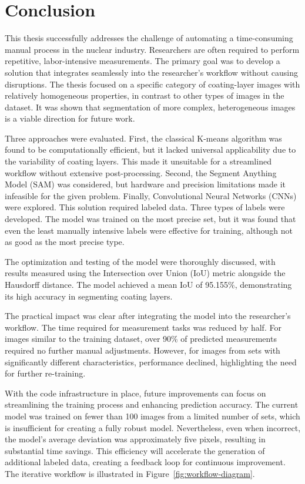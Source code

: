 \chapter{Conclusion} \label{chap:con}

This thesis successfully addresses the challenge of automating a time-consuming manual process in the nuclear industry. Researchers are often required to perform repetitive, labor-intensive measurements. The primary goal was to develop a solution that integrates seamlessly into the researcher’s workflow without causing disruptions. The thesis focused on a specific category of coating-layer images with relatively homogeneous properties, in contrast to other types of images in the dataset. It was shown that segmentation of more complex, heterogeneous images is a viable direction for future work.

Three approaches were evaluated. First, the classical K-means algorithm was found to be computationally efficient, but it lacked universal applicability due to the variability of coating layers. This made it unsuitable for a streamlined workflow without extensive post-processing. Second, the Segment Anything Model (SAM) was considered, but hardware and precision limitations made it infeasible for the given problem. Finally, Convolutional Neural Networks (CNNs) were explored. This solution required labeled data. Three types of labels were developed. The model was trained on the most precise set, but it was found that even the least manually intensive labels were effective for training, although not as good as the most precise type.

The optimization and testing of the model were thoroughly discussed, with results measured using the Intersection over Union (IoU) metric alongside the Hausdorff distance. The model achieved a mean IoU of  95.155\%, demonstrating its high accuracy in segmenting coating layers.

The practical impact was clear after integrating the model into the researcher’s workflow. The time required for measurement tasks was reduced by half. For images similar to the training dataset, over 90\% of predicted measurements required no further manual adjustments. However, for images from sets with significantly different characteristics, performance declined, highlighting the need for further re-training.

With the code infrastructure in place, future improvements can focus on streamlining the training process and enhancing prediction accuracy. The current model was trained on fewer than 100 images from a limited number of sets, which is insufficient for creating a fully robust model. Nevertheless, even when incorrect, the model's average deviation was approximately five pixels, resulting in substantial time savings. This efficiency will accelerate the generation of additional labeled data, creating a feedback loop for continuous improvement. The iterative workflow is illustrated in Figure~\ref{fig:workflow-diagram}.

